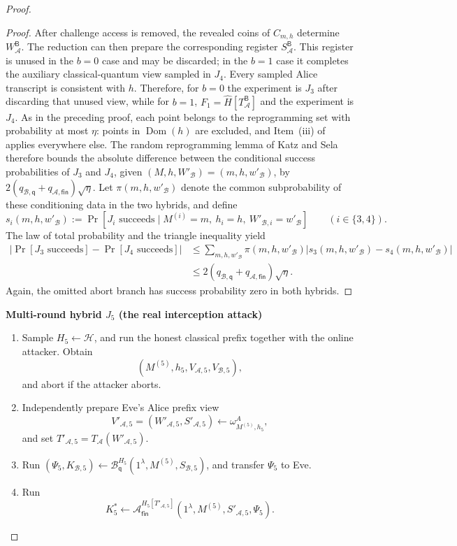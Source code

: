 \documentclass[11pt]{article}
\newcommand{\cA}{\mathcal{A}}
\newcommand{\cB}{\mathcal{B}}
\newcommand{\cH}{\mathcal{H}}
\newcommand{\Dom}{\operatorname{Dom}}
\newcommand{\changed}[1]{\textcolor{purple!75!black}{#1}}
\newcommand{\mrchanged}[1]{\changed{#1}}
\newenvironment{hybrid}[1]{%
  \par\medskip
  \noindent\textbf{#1}
  \begin{enumerate}[leftmargin=2.5em,label=\arabic*.,itemsep=0.25em,topsep=0.35em]
}{%
  \end{enumerate}
  \medskip
}
\begin{document}
\begin{proof}
\begin{proof}
After challenge access is removed, the revealed coins of \(C_{m,h}\)
determine \(W^{\mathsf B}_{\cA}\). The reduction can then prepare the
corresponding register \(S^{\mathsf B}_{\cA}\). This register is unused in
the \(b=0\) case and may be discarded; in the \(b=1\) case it completes the
auxiliary classical-quantum view sampled in \(J_4\). Every sampled Alice
transcript is consistent with \(h\). Therefore, for \(b=0\) the experiment
is \(J_3\) after discarding that unused view, while for \(b=1\),
\(F_1=\widehat H[T^{\mathsf B}_{\cA}]\) and the experiment is \(J_4\).
As in the preceding proof, each point belongs to the reprogramming set with
probability at most \(\eta\): points in \(\Dom(h)\) are excluded, and
Item~(iii) of  applies everywhere else.
The random reprogramming lemma of Katz and Sela
\cite[Lemma~3]{KatzSela24} therefore bounds the absolute difference
between the conditional success probabilities of \(J_3\) and \(J_4\), given
\((M,h,W'_{\cB})=(m,h,w'_{\cB})\), by
\(2(q_{\cB,\mathsf q}+q_{\cA,\mathsf{fin}})\sqrt\eta\). Let
\(\pi(m,h,w'_{\cB})\) denote the common subprobability of these conditioning
data in the two hybrids, and define
\[
  s_i(m,h,w'_{\cB})
  :=
  \Pr[J_i\text{ succeeds}\mid
    M^{(i)}=m,\ h_i=h,\ W'_{\cB,i}=w'_{\cB}]
  \qquad (i\in\{3,4\}).
\]
The law of total probability and the triangle inequality yield
\[
  \begin{aligned}
  \left|\Pr[J_3\text{ succeeds}]-\Pr[J_4\text{ succeeds}]\right|
  &\le
  \sum_{m,h,w'_{\cB}}\pi(m,h,w'_{\cB})
  \left|s_3(m,h,w'_{\cB})-s_4(m,h,w'_{\cB})\right|\\
  &\le
  2(q_{\cB,\mathsf q}+q_{\cA,\mathsf{fin}})\sqrt\eta.
  \end{aligned}
\]
Again, the omitted abort branch has success probability zero in both
hybrids.
\end{proof}

\begin{hybrid}{Multi-round hybrid \(J_5\) (the real interception attack)}
  \item \mrchanged{Sample \(H_5\leftarrow\cH\), and run the honest classical prefix
  together with the online attacker.  Obtain
  \[
    (M^{(5)},h_5,V_{\cA,5},V_{\cB,5}),
  \]
  and abort if the attacker aborts.}
  \item Independently prepare Eve's Alice prefix view
  \[
    V'_{\cA,5}
    =(W'_{\cA,5},S'_{\cA,5})
    \leftarrow\omega^A_{M^{(5)},h_5},
  \]
  and set \(T'_{\cA,5}=T_{\cA}(W'_{\cA,5})\).
  \item \mrchanged{Run
  \((\Psi_5,K_{\cB,5})\leftarrow
    \cB_{\mathsf q}^{H_5}
    (1^\lambda,M^{(5)},S_{\cB,5})\),
  and transfer \(\Psi_5\) to Eve.}
  \item Run
  \[
    K^*_5
    \leftarrow
    \cA_{\mathsf{fin}}^{H_5[T'_{\cA,5}]}
    (1^\lambda,M^{(5)},S'_{\cA,5},\Psi_5).
  \]
\end{hybrid}


\end{proof}
\end{document}
